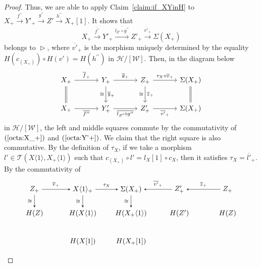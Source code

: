 \documentclass[a4paper,reqno,10pt]{amsart}
\theoremstyle{definition}
\theoremstyle{definition}
\theoremstyle{definition}
\theoremstyle{definition}
\theoremstyle{plain}
\newcommand{\CH}{\mathcal{H}}
\newcommand{\CT}{\mathcal{T}}
\newcommand{\CW}{\mathcal{W}}
\begin{document}
\begin{proof}
Thus, we are able to apply Claim~\ref{claim:if_XYinH} to $X_+\xrightarrow{f^{\prime\prime}}Y'_+\xrightarrow{g^{\prime\prime}}Z'\xrightarrow{h^{\prime\prime}}X_+[1]$.
It shows that 
\[
X_+\xrightarrow{\overline{f^{\prime\prime}}}Y'_+\xrightarrow{\overline{l_{Z'}\circ g^{\prime\prime}}}Z'_+\xrightarrow{\overline{v'}_+}\Sigma (X_+)
\]
belongs to $\vartriangleright$, where $\overline{v'}_+$ is the morphism uniquely determined by the equality $H(c_{(X_+)})\circ H(v')=H(h^{\prime\prime})$ in $\CH/[\CW]$.
Then, in the diagram below
\begin{equation}\label{to_be_a_morph_of_right_tri}
\begin{tikzcd}[row sep=0.8cm, column sep=1.2cm]
X_+ \arrow{r}{\overline{f}_+}\arrow[d, equal]
&Y_+ \arrow{d}{\overline{y}_+}[swap]{\cong} \arrow{r}{\overline{g}_+}
&Z_+\arrow{r}{\tau_X\circ\overline{v}_+} \arrow{d}[swap]{\cong}{\overline{z}_+}
&\Sigma(X_+) \arrow[d, equal]
\\
X_+\arrow{r}[swap]{\overline{f^{\prime\prime}}}
&Y'_+\arrow{r}[swap]{\overline{l_{Z'}\circ g^{\prime\prime}}}
&Z'_+ \arrow{r}[swap]{\overline{v'}_+}
&\Sigma(X_+)
\end{tikzcd}
\end{equation}
in $\CH/[\CW]$, the left and middle squares commute by the commutativity of $(\ref{octa:X_+})$ and $(\ref{octa:Y'+})$.
We claim that the right square is also commutative.
By the definition of $\tau_X$, if we take a morphism $l'\in\CT(X\langle1\rangle,X_+\langle1\rangle)$ such that $c_{(X_+)}\circ l'=l_X[1]\circ c_X$, then it satisfies 
\color{blue}
$\tau_X=\overline{l'}_+$. 
\normalcolor
By the commutativity of
\[
\begin{tikzpicture}[>=stealth]
\node (1) at (-4.8,1.2) {$Z_+$};
\node (2) at (-2.4,1.2) {$X\langle1\rangle_+$};
\node (3) at (0,1.2) {$\Sigma(X_+)$};
\node (4) at (2.4,1.2) {$Z'_+$};
\node (5) at (4.8,1.2) {$Z_+$};
\node (11) at (-4.8,0) {$H(Z)$};
\node (12) at (-2.4,0) {$H(X\langle1\rangle)$};
\node (13) at (0,0) {$H(X_+\langle1\rangle)$};
\node (14) at (2.4,0) {$H(Z')$};
\node (15) at (4.8,0) {$H(Z)$};
\node (22) at (-2.4,-1.4) {$H(X{[}1{]})$};
\node (23) at (0,-1.4) {$H(X_+{[}1{]})$};
\draw[->] (1) -- node[above,font=\scriptsize] {$\overline{v}_+$} (2);
\draw[->] (2) -- node[above,font=\scriptsize] {$\tau_X$} (3);
\draw[->] (4) -- node[above,font=\scriptsize] {$\overline{v'}_+$} (3);
\draw[->] (5) -- node[above,font=\scriptsize] {$\overline{z}_+$} (4);
\draw[->] (1) -- node[left,font=\scriptsize] {$\cong$} (11);
\draw[->] (2) -- node[left,font=\scriptsize] {$\cong$} (12);
\draw[->] (3) -- node[left,font=\scriptsize] {$\cong$} (13);

\end{tikzpicture}\]
\end{proof}
\end{document}
